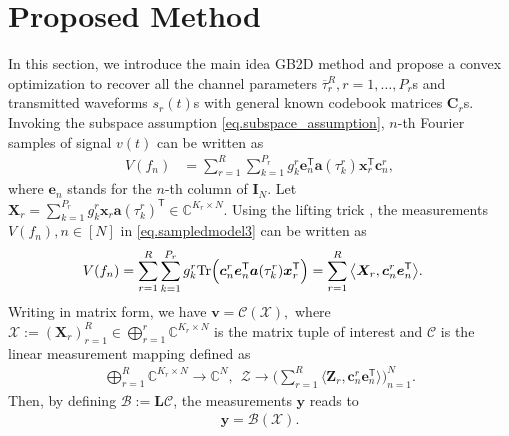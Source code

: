 \documentclass[conference,10pt]{IEEEtran}
\theoremstyle{remark}
\theoremstyle{plain}
\theoremstyle{definition}
\theoremstyle{remark}
\begin{document}
\section{Proposed Method}\label{sec.proposed}
 In this section, we introduce the main idea GB2D method and propose a convex optimization to recover all the channel parameters $\overline{\tau}_r^R, r=1, \ldots, P_r$s and transmitted waveforms $s_r(t)$s with general known codebook matrices $\bm{C}_r$s.  Invoking the subspace assumption \eqref{eq.subspace_assumption},  $n$-th Fourier samples of signal $v(t)$ can be written as 
 \begin{align}\label{eq.sampledmodel3}
 V(f_n)&= \sum_{r=1}^R\sum_{k=1}^{P_r}g_k^r\bm{e}_n^{\mathsf{T}}\bm{a}(\tau_k^r)\bm{x}_r^{\mathsf{T}}\bm{c}^r_n,
 \end{align}
 where $\bm{e}_n$ stands for the $n$-th column of $\bm{I}_{N}$. Let $\bm{X}_r=\sum_{k=1}^{P_r} g_k^r\bm{x}_r\bm{a}(\tau_k^r)^{\mathsf{T}}\in\mathbb{C}^{K_r\times N}$. Using the lifting trick \cite{ling2015self}, the measurements $V(f_n), n\in [N]$ in \eqref{eq.sampledmodel3} can be written as
 \begin{align}\label{eq:SamplesInner}
 &V(f_n)=\sum_{r=1}^R\sum_{k=1}^{P_r}g_k^r {\rm Tr}\Big(\bm{c}^r_n\bm{e}_n^{\mathsf{T}}\bm{a}(\tau_k^r)\bm{x}_r^{\mathsf{T}}\Big)=\sum_{r=1}^R\big\langle \bm{X}_r, \bm{c}^r_n\bm{e}_n^{\mathsf{T}}\big\rangle.
 \end{align} 
 Writing in matrix form, we have $\bm{v}=\mathcal{C}(\bm{\mathcal{X}}),$ where $\bm{\mathcal{X}}:=(\bm{X}_r)_{r=1}^R\in \bigoplus_{r=1}^r\mathbb{C}^{K_r\times N}$ is the matrix tuple of interest and $\mathcal{C}$ is the linear measurement mapping defined as
 \begin{align*}
 \bigoplus_{r=1}^R\mathbb{C}^{K_r\times N}\rightarrow \mathbb{C}^N,~~ \bm{\mathcal{Z}}\rightarrow \Bigg(\sum_{r=1}^R\big\langle \bm{Z}_r, \bm{c}^r_n\bm{e}_n^{\mathsf{T}}\big\rangle\Bigg)_{n=1}^{N}.	
 \end{align*}
Then, by defining $ \mathcal{B} := \bm{L}\mathcal{C}$, the measurements $\bm{y}$ reads to
\begin{align}\label{eq:measure_model1}
    \bm{y}  =  \mathcal{B}(\mathcal{X}). 
\end{align} 
 
\end{document}
